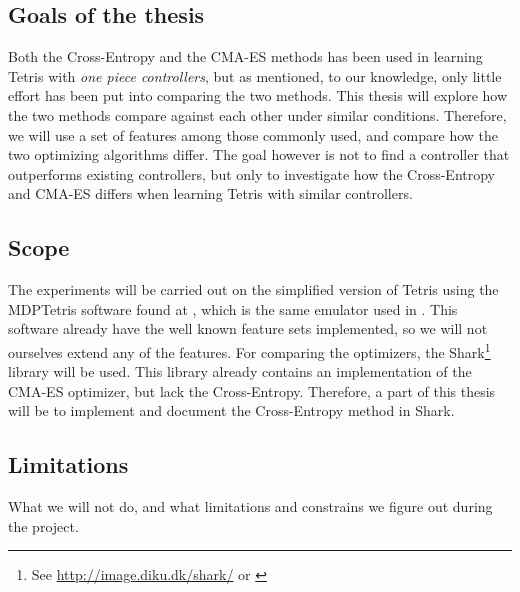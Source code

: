 \subsection{Goals of the thesis}


Both the Cross-Entropy and the CMA-ES methods has been used 
in learning Tetris with \textit{one piece controllers}, but as 
mentioned, to our knowledge, only little effort has been put into 
comparing the two methods. This thesis will explore
how the two methods compare against each other under similar
conditions. Therefore, we will use a set of features among those
commonly used, and compare how the two optimizing algorithms 
differ. The goal however is not to find a controller that 
outperforms existing controllers, but only to investigate 
how the Cross-Entropy and CMA-ES differs when learning Tetris
with similar controllers.


\subsection{Scope\label{section:scope}}

The experiments will be carried out on the simplified version of
Tetris using the MDPTetris software found at \cite{mdptetris},
which is the same emulator used in \cite{scherrer2009:b}.
This software already have the well known feature sets
implemented, so we will not ourselves extend any of the features.
For comparing the optimizers, the Shark\footnote{See \url{http://image.diku.dk/shark/} or  \cite{shark08}
} library will be used. This library already contains an
implementation of the CMA-ES optimizer, but lack the 
Cross-Entropy. Therefore, a part of this thesis will
be to implement and document the Cross-Entropy method in Shark.


\subsection{Limitations}

What we will not do, and what limitations and constrains
we figure out during the project.

